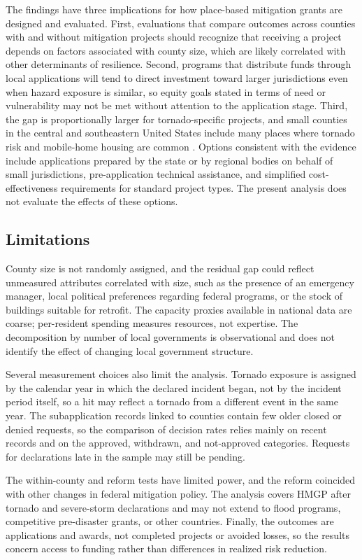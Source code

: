 The findings have three implications for how place-based mitigation grants are designed and evaluated. First, evaluations that compare outcomes across counties with and without mitigation projects should recognize that receiving a project depends on factors associated with county size, which are likely correlated with other determinants of resilience. Second, programs that distribute funds through local applications will tend to direct investment toward larger jurisdictions even when hazard exposure is similar, so equity goals stated in terms of need or vulnerability may not be met without attention to the application stage. Third, the gap is proportionally larger for tornado-specific projects, and small counties in the central and southeastern United States include many places where tornado risk and mobile-home housing are common \parencite{ashley2007fatalities,sutter2010mobile}. Options consistent with the evidence include applications prepared by the state or by regional bodies on behalf of small jurisdictions, pre-application technical assistance, and simplified cost-effectiveness requirements for standard project types. The present analysis does not evaluate the effects of these options.

\subsection{Limitations}
\label{sec:limitations}

County size is not randomly assigned, and the residual gap could reflect unmeasured attributes correlated with size, such as the presence of an emergency manager, local political preferences regarding federal programs, or the stock of buildings suitable for retrofit. The capacity proxies available in national data are coarse; per-resident spending measures resources, not expertise. The decomposition by number of local governments is observational and does not identify the effect of changing local government structure.

Several measurement choices also limit the analysis. Tornado exposure is assigned by the calendar year in which the declared incident began, not by the incident period itself, so a hit may reflect a tornado from a different event in the same year. The subapplication records linked to counties contain few older closed or denied requests, so the comparison of decision rates relies mainly on recent records and on the approved, withdrawn, and not-approved categories. Requests for declarations late in the sample may still be pending.

The within-county and reform tests have limited power, and the reform coincided with other changes in federal mitigation policy. The analysis covers HMGP after tornado and severe-storm declarations and may not extend to flood programs, competitive pre-disaster grants, or other countries. Finally, the outcomes are applications and awards, not completed projects or avoided losses, so the results concern access to funding rather than differences in realized risk reduction.
